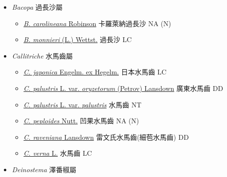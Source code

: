 
  \begin{itemize}
 \item[] \textit{Bacopa} 過長沙屬
                                
  \begin{itemize}
        \item[] \href{http://www.theplantlist.org/tpl1.1/search?q=Bacopa+carolineana}{\textit{B. carolineana} Robinson}   卡羅萊納過長沙   NA (N)
        \item[] \href{http://www.theplantlist.org/tpl1.1/search?q=Bacopa+monnieri}{\textit{B. monnieri} (L.) Wettst.}   過長沙   LC
  \end{itemize}
 \item[] \textit{Callitriche} 水馬齒屬
                                
  \begin{itemize}
        \item[] \href{http://www.theplantlist.org/tpl1.1/search?q=Callitriche+japonica}{\textit{C. japonica} Engelm. ex Hegelm.}   日本水馬齒   LC
        \item[] \href{http://www.theplantlist.org/tpl1.1/search?q=Callitriche+palustris+var.+oryzetorum}{\textit{C. palustris} L. var. \textit{oryzetorum} (Petrov) Lansdown}   廣東水馬齒   DD
        \item[] \href{http://www.theplantlist.org/tpl1.1/search?q=Callitriche+palustris+var.+palustris}{\textit{C. palustris} L. var. \textit{palustris}}   水馬齒   NT
        \item[] \href{http://www.theplantlist.org/tpl1.1/search?q=Callitriche+peploides}{\textit{C. peploides} Nutt.}   凹果水馬齒   NA (N)
        \item[] \href{http://www.theplantlist.org/tpl1.1/search?q=Callitriche+raveniana}{\textit{C. raveniana} Lansdown}   雷文氏水馬齒(細苞水馬齒)   DD
        \item[] \href{http://www.theplantlist.org/tpl1.1/search?q=Callitriche+verna}{\textit{C. verna} L.}   水馬齒   LC
  \end{itemize}
 \item[] \textit{Deinostema} 澤番椒屬
                                

\end{itemize}
